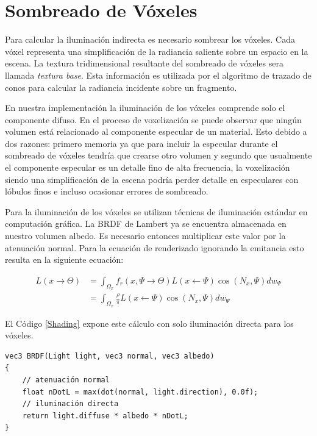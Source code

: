 \section{Sombreado de Vóxeles} %
\label{sec:sombreado_de_voxeles_impl}
Para calcular la iluminación indirecta es necesario sombrear los vóxeles. Cada vóxel representa una simplificación de la radiancia saliente sobre un espacio en la escena. La textura tridimensional resultante del sombreado de vóxeles sera llamada \emph{textura base}. Esta información es utilizada por el algoritmo de trazado de conos para calcular la radiancia incidente sobre un fragmento.

En nuestra implementación la iluminación de los vóxeles comprende solo el componente difuso. En el proceso de voxelización se puede observar que ningún volumen está relacionado al componente especular de un material. Esto debido a dos razones: primero memoria ya que para incluir la especular durante el sombreado de vóxeles tendría que crearse otro volumen y segundo que usualmente el componente especular es un detalle fino de alta frecuencia, la voxelización siendo una simplificación de la escena podría perder detalle en especulares con lóbulos finos e incluso ocasionar errores de sombreado.

Para la iluminación de los vóxeles se utilizan técnicas de iluminación estándar en computación gráfica. La \ac{BRDF} de Lambert ya se encuentra almacenada en nuestro volumen albedo. Es necesario entonces multiplicar este valor por la atenuación normal. Para la ecuación de renderizado ignorando la emitancia esto resulta en la siguiente ecuación:

\begin{equation}
	\begin{split}
		L(x\to\Theta) &= \int_{\Omega_{x}}{f_{r}(x, \Psi\to\Theta)L(x\gets\Psi)\cos(N_{x}, \Psi)dw_{\Psi}}\\
		&= \int_{\Omega_{x}}{\frac{\rho}{\pi}L(x\gets\Psi)\cos(N_{x}, \Psi)dw_{\Psi}}
	\end{split}
	\label{eq:shading_voxels}
\end{equation}

El Código \ref{Shading} expone este cálculo con solo iluminación directa para los vóxeles.
\\
\begin{lstlisting}[caption={Sombreado estándar para un vóxel}, label=Shading]
vec3 BRDF(Light light, vec3 normal, vec3 albedo)
{
	// atenuación normal
	float nDotL = max(dot(normal, light.direction), 0.0f);
	// iluminación directa
	return light.diffuse * albedo * nDotL;
}
\end{lstlisting}

